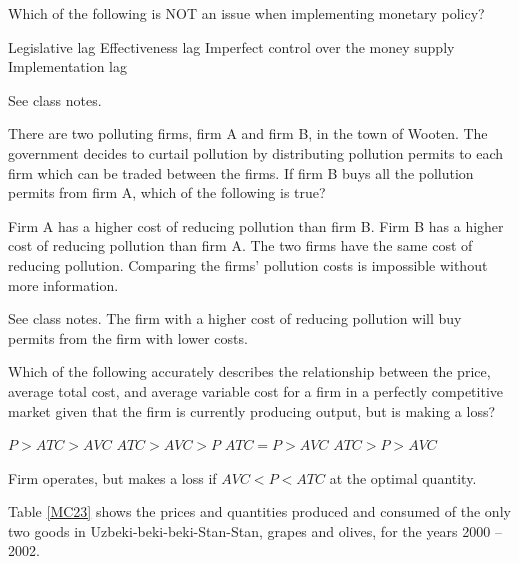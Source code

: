\documentclass[addpoints,11pt]{exam}
\theoremstyle{definition}
\begin{document}
\begin{questions}
\question Which of the following is NOT an issue when implementing monetary policy?

\begin{choices}
\CorrectChoice Legislative lag
\choice Effectiveness lag
\choice Imperfect control over the money supply
\choice Implementation lag
\end{choices}

\begin{solution}
See class notes.
\end{solution}

\question There are two polluting firms, firm A and firm B, in the town of Wooten. The government decides to curtail pollution by distributing pollution permits to each firm which can be traded between the firms. If firm B buys all the pollution permits from firm A, which of the following is true?

\begin{choices}
\choice Firm A has a higher cost of reducing pollution than firm B.
\CorrectChoice Firm B has a higher cost of reducing pollution than firm A.
\choice The two firms have the same cost of reducing pollution.
\choice Comparing the firms' pollution costs is impossible without more information.
\end{choices}

\begin{solution}
See class notes. The firm with a higher cost of reducing pollution will buy permits from the firm with lower costs.
\end{solution}

\newpage

\question Which of the following accurately describes the relationship between the price, average total cost, and average variable cost for a firm in a perfectly competitive market given that the firm is currently producing output, but is making a loss?

\begin{choices}
\choice $ P > ATC > AVC$
\choice $ ATC > AVC > P$
\choice $ ATC = P > AVC$
\CorrectChoice $ ATC > P > AVC$
\end{choices}

\begin{solution}
Firm operates, but makes a loss if $AVC < P < ATC$ at the optimal quantity.
\end{solution}

\question Table \ref{MC23} shows the prices and quantities produced and consumed of the only two goods in Uzbeki-beki-beki-Stan-Stan, grapes and olives, for the years 2000 -- 2002.
	

\end{questions}
\end{document}
